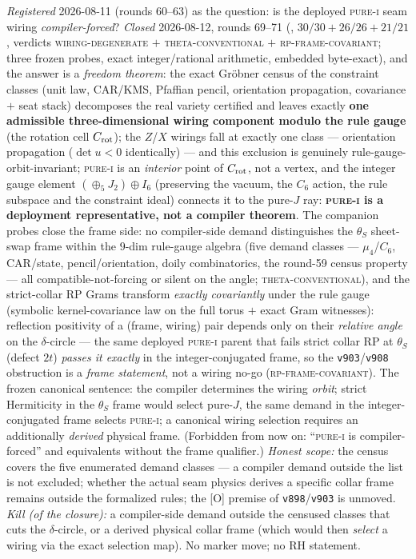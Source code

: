 {\sloppy
\emph{Registered} 2026-08-11 (rounds 60--63) as the question:
is the deployed \textsc{pure-i} seam wiring
\emph{compiler-forced}?  \emph{Closed} 2026-08-12, rounds
69--71 (, $30/30 + 26/26 +
21/21$, verdicts \textsc{wiring-degenerate} $+$
\textsc{theta-conventional} $+$ \textsc{rp-frame-covariant};
three frozen probes, exact integer/rational arithmetic,
embedded byte-exact), and the answer is a \emph{freedom
theorem}: the exact Gr\"obner census of the constraint classes
(unit law, CAR/KMS, Pfaffian pencil, orientation propagation,
covariance $+$ seat stack) decomposes the real variety
certified and leaves exactly \textbf{one admissible
three-dimensional wiring component modulo the rule gauge} (the
rotation cell $C_{\rm rot}$); the $Z$/$X$ wirings fall at
exactly one class --- orientation propagation ($\det u < 0$
identically) --- and this exclusion is genuinely
rule-gauge-orbit-invariant; \textsc{pure-i} is an
\emph{interior} point of $C_{\rm rot}$, not a vertex, and the
integer gauge element $(\oplus_5 J_2) \oplus I_6$ (preserving
the vacuum, the $C_6$ action, the rule subspace and the
constraint ideal) connects it to the pure-$J$ ray:
\textbf{\textsc{pure-i} is a deployment representative, not a
compiler theorem}.  The companion probes close the frame side:
no compiler-side demand distinguishes the $\theta_S$ sheet-swap
frame within the $9$-dim rule-gauge algebra (five demand
classes --- $\mu_4$/$C_6$, CAR/state, pencil/orientation, doily
combinatorics, the round-59 census property --- all
compatible-not-forcing or silent on the angle;
\textsc{theta-conventional}), and the strict-collar RP Grams
transform \emph{exactly covariantly} under the rule gauge
(symbolic kernel-covariance law on the full torus $+$ exact
Gram witnesses): reflection positivity of a (frame, wiring)
pair depends only on their \emph{relative angle} on the
$\delta$-circle --- the same deployed \textsc{pure-i} parent
that fails strict collar RP at $\theta_S$ (defect $2t$)
\emph{passes it exactly} in the integer-conjugated frame, so
the \texttt{v903}/\texttt{v908} obstruction is a
\emph{frame statement}, not a wiring no-go
(\textsc{rp-frame-covariant}).  The frozen canonical sentence:
the compiler determines the wiring \emph{orbit}; strict
Hermiticity in the $\theta_S$ frame would select pure-$J$, the
same demand in the integer-conjugated frame selects
\textsc{pure-i}; a canonical wiring selection requires an
additionally \emph{derived} physical frame.  (Forbidden from
now on: ``\textsc{pure-i} is compiler-forced'' and equivalents
without the frame qualifier.)  \emph{Honest scope:} the census
covers the five enumerated demand classes --- a compiler demand
outside the list is not excluded; whether the actual seam
physics derives a specific collar frame remains outside the
formalized rules; the [O] premise of
\texttt{v898}/\texttt{v903} is unmoved.  \emph{Kill (of the
closure):} a compiler-side demand outside the censused classes
that cuts the $\delta$-circle, or a derived physical collar
frame (which would then \emph{select} a wiring via the exact
selection map).  No marker move; no RH statement.\par}

